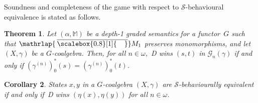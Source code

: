 \documentclass[sigconf,
			final%
			nonacm
                        ]{acmart}
\numberwithin{equation}{section}
\numberwithin{equation}{section}
\theoremstyle{plain}
\newtheorem{thm}{Theorem}[section]
\newtheorem{cor}[thm]{Corollary}
\theoremstyle{definition}
\newcommand{\mybar}[3]{%
  \mathrlap{\hspace{#2}\overline{\scalebox{#1}[1]{\hphantom{\ensuremath{#3}}\vphantom{\rule{0pt}{5.5pt}}}}}\ensuremath{#3}
}
\newcommand{\barM}{\mybar{0.8}{2pt}{M}_1}
\newcommand{\M}{\mathbb{M}}                   %
\newcommand{\CalG}{\mathcal{G}}             %
\newcommand{\CalS}{\mathcal{S}}        %
\begin{document}
\noindent Soundness and completeness of the game with respect to
$\CalS$-behavioural equivalence is stated as follows.


\begin{thm}\label{T:sound-complete}
  Let $(\alpha, \M)$ be a depth-1 graded semantics for a functor~$G$
  such that $\barM$ preserves monomorphisms, and let $(X, \gamma)$ be
  a $G$-coalgebra. Then, for all $n\in\omega$,~D wins $(s, t)$ in
  $\CalG_n(\gamma)$ if and only if
  $(\gamma^{(n)})^*_0(s) = (\gamma^{(n)})^*_0(t)$.
\end{thm}


\begin{cor}
  States $x,y$ in a $G$-coalgebra $(X, \gamma)$ are
  $\CalS$-behaviourally equivalent if and only if~D wins
  $(\eta(x), \eta(y))$ for all $n\in\omega$.
\end{cor}
\end{document}
